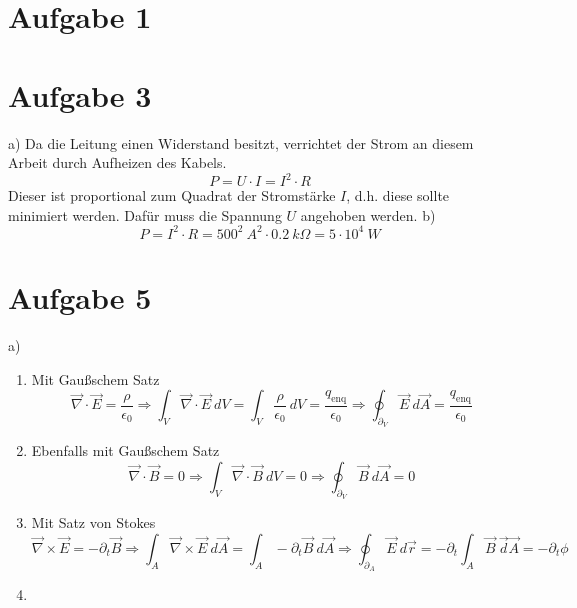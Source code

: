 \documentclass[11pt a4paper]{article}
\newcommand{\delt}{\partial_t}
\newcommand{\epsz}{\epsilon_0}
\newcommand{\diver}{\vec \nabla \cdot}
\newcommand{\rot}{\vec \nabla \times}
\begin{document}
\thispagestyle{fancy}

\section*{Aufgabe 1}

\newpage
\setlength{\headheight}{0cm}

\section*{Aufgabe 3}
a) Da die Leitung einen Widerstand besitzt, verrichtet der Strom an diesem Arbeit durch Aufheizen des Kabels.
\[ P = U \cdot I = I^2 \cdot R \]
Dieser ist proportional zum Quadrat der Stromstärke $I$, d.h. diese sollte minimiert werden. Dafür muss die 
Spannung $U$ angehoben werden.
b)
\[
	P = I^2 \cdot R = 500^2 \ A^2 \cdot 0.2 \ k\Omega = 5 \cdot 10^4 \ W
\]

\newpage

\section*{Aufgabe 5}
a) 
\begin{enumerate}
	\item Mit Gaußschem Satz
	\[ 
		\diver \vec E = \frac{\rho}{\epsz} 
		\Rightarrow
		\int_V \diver \vec E \ dV = \int_V \frac{\rho}{\epsz} \ dV = \frac{q_\text{enq}}{\epsz}
		\Rightarrow
		\oint_{\partial_V} \vec E \ d\vec A = \frac{q_\text{enq}}{\epsz}
	\]
	\item Ebenfalls mit Gaußschem Satz
	\[
		\diver \vec B = 0
		\Rightarrow
		\int_V \diver \vec B \ dV = 0
		\Rightarrow
		\oint_{\partial_V} \vec B \ d\vec A = 0
	\]
	\item Mit Satz von Stokes
	\[
		\rot \vec E = -\delt \vec B
		\Rightarrow
		\int_A \rot \vec E \ d\vec A = \int_A -\delt \vec B \ d\vec A
		\Rightarrow
		\oint_{\partial_A} \vec E \ d\vec r = -\delt \int_A \vec B \ \vec d\vec A = -\delt \phi
	\]
	\item 
\end{enumerate}
\end{document}
